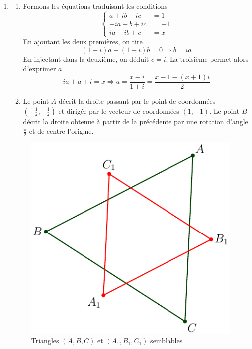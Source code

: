 \begin{enumerate}
 \item 
\begin{enumerate}
 \item Formons les équations traduisant les conditions
\begin{displaymath}
 \left\lbrace 
\begin{aligned}
 a+ib-ic &= 1 \\ -ia+b+ic &= -1 \\ ia -ib +c &= x
\end{aligned}
\right. 
\end{displaymath}
En ajoutant les deux premières, on tire
\begin{displaymath}
 (1-i)a+(1+i)b=0 \Rightarrow b = ia
\end{displaymath}
En injectant dans la deuxième, on déduit $c=i$. La troisième permet alors d'exprimer $a$
\begin{displaymath}
 ia+a+i = x \Rightarrow a =\frac{x-i}{1+i}=\frac{x-1-(x+1)i}{2}
\end{displaymath}
 \item Le point $A$ décrit la droite passant par le point de coordonnées $(-\frac{1}{2},-\frac{1}{2})$ et dirigée par le vecteur de coordonnées $(1,-1)$. Le point $B$ décrit la droite obtenue à partir de la précédente par une rotation d'angle $\frac{\pi}{2}$ et de centre l'origine.
\end{enumerate}
\begin{figure}[h!]
 \centering
 \includegraphics{./Ccomp12_1.pdf}
 \caption{Triangles $(A,B,C)$ et $(A_1,B_1,C_1)$ semblables}
 \label{fig:Ccomp12_1}
\end{figure}


\end{enumerate}
